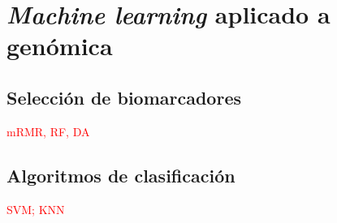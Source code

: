 \chapter{\textit{Machine learning} aplicado a genómica}

\section{Selección de biomarcadores}

\textcolor{red}{mRMR, RF, DA}

\section{Algoritmos de clasificación}

\textcolor{red}{SVM; KNN}
